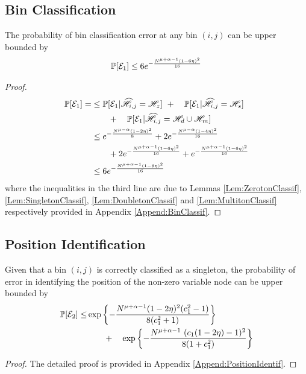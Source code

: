 \subsection{\bf Bin Classification}
\begin{lemma}
The probability of bin classification error at any bin $(i,j)$ can be upper bounded by
\begin{align*}
\mathbb{P}[\mathcal{E}_1]\leq 6e^{-\frac{N^{\mu+\alpha-1}(1-6\eta)^2}{16}}
\end{align*} \label{Lem:binclassification}
\end{lemma}
\begin{proof}
\begin{align*}
\mathbb{P}[\mathcal{E}_1] =& \leq \mathbb{P}[\mathcal{E}_1|\widehat{\mathscr{H}}_{i,j}=\mathscr{H}_z]~+
						\quad \mathbb{P}[\mathcal{E}_1|\widehat{\mathscr{H}}_{i,j}=\mathscr{H}_s]~ \\
						&\qquad + \quad \mathbb{P}[\mathcal{E}_1|\widehat{\mathscr{H}}_{i,j}=\mathscr{H}_d \cup \mathscr{H}_m]\\
    			&\leq  e^{-\frac{N^{\mu-\alpha}(1-2\eta)^2}{8}}+2e^{-\frac{N^{\mu-\alpha}(1-4\eta)^2}{16}}\\ & \qquad + 2e^{-\frac{N^{\mu+\alpha-1}(1-6\eta)^2}{16}}+e^{-\frac{N^{\mu+\alpha-1}(1-6\eta)^2}{16}}\\
    			&\leq 6e^{-\frac{N^{\mu+\alpha-1}(1-6\eta)^2}{16}}\\
 \end{align*}
{where the inequalities in the third line are due to Lemmas \ref{Lem:ZerotonClassif}, \ref{Lem:SingletonClassif}, \ref{Lem:DoubletonClassif} and \ref{Lem:MultitonClassif} respectively provided in Appendix \ref{Append:BinClassif}.}
\end{proof}

\subsection{\bf Position Identification}
\begin{lemma}
Given that a bin $(i,j)$ is correctly classified as a singleton, the probability of error in identifying the position of the non-zero variable node can be upper bounded by
\begin{align*}
\mathbb{P}[\mathcal{E}_2]\leq & \exp\left\lbrace-\frac{N^{\mu+\alpha-1}(1-2\eta)^2(c_1^2-1)}{8(c_1^2+1)}\right\rbrace\\
 &\qquad + \quad \exp\left\lbrace-\frac{N^{\mu+\alpha-1} ~ (c_1(1 - 2\eta) - 1)^2}{8(1+ c_1^2)}\right\rbrace
\end{align*}\label{Lem:posidentification}
\end{lemma}
\begin{proof}
	The detailed proof is provided in Appendix \ref{Append:PositionIdentif}.
\end{proof}

